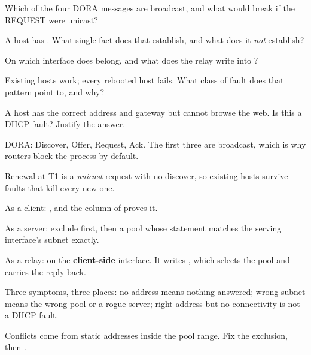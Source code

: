 \begin{checkpoint}
\begin{tightnum}
  \item Which of the four DORA messages are broadcast, and what would break if
        the REQUEST were unicast?
  \item A host has . What single fact does that establish, and
        what does it \emph{not} establish?
  \item On which interface does  belong, and what does the
        relay write into ?
  \item Existing hosts work; every rebooted host fails. What class of fault does
        that pattern point to, and why?
  \item A host has the correct address and gateway but cannot browse the web. Is
        this a DHCP fault? Justify the answer.
\end{tightnum}
\end{checkpoint}

\begin{chaptersummary}
\begin{tight}
  \item DORA: Discover, Offer, Request, Ack. The first three are broadcast, which
        is why routers block the process by default.
  \item Renewal at T1 is a \emph{unicast} request with no discover, so existing
        hosts survive faults that kill every new one.
  \item As a client: , and the  column of
         proves it.
  \item As a server: exclude first, then a pool whose  statement
        matches the serving interface's subnet exactly.
  \item As a relay:  on the \textbf{client-side}
        interface. It writes , which selects the pool and carries the
        reply back.
  \item Three symptoms, three places: no address means nothing answered; wrong
        subnet means the wrong pool or a rogue server; right address but no
        connectivity is not a DHCP fault.
  \item Conflicts come from static addresses inside the pool range. Fix the
        exclusion, then .
\end{tight}
\end{chaptersummary}

